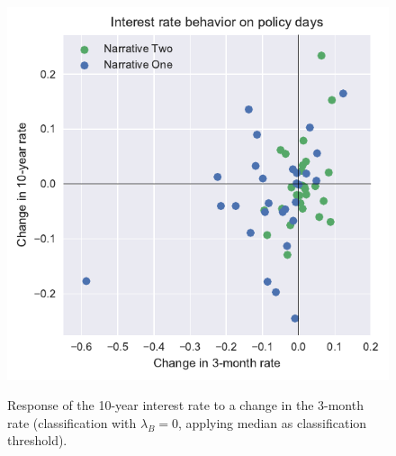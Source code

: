 \documentclass[11pt,a4paper,english,oneside]{book}
\numberwithin{equation}{chapter}
\begin{document}
\begin{figure}
	\caption{Response of the 10-year interest rate to a change in the 3-month rate (classification with $\lambda_B=0$, applying median as classification threshold).}
	\centering
	\includegraphics[scale=1]{Images/ChangePlotmod_L0_0.pdf}
	\label{Change02mod_L00}
\end{figure}

\end{document}
